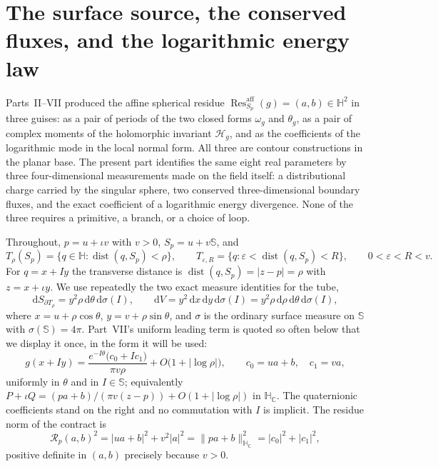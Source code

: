 \documentclass[11pt,a4paper]{article}
\numberwithin{equation}{section}
\theoremstyle{definition}
\theoremstyle{remark}
\theoremstyle{plain}
\newcommand{\HH}{\mathbb H}
\newcommand{\HC}{\mathbb H_{\mathbb C}}
\newcommand{\SSS}{\mathbb S}
\newcommand{\om}{\omega}
\newcommand{\thet}{\theta}
\newcommand{\Sp}{S_{p}}
\newcommand{\Rp}{\mathcal R_{p}}      %
\newcommand{\Hg}{\mathcal H_{g}}      %
\newcommand{\Tube}{T}
\newcommand{\abs}[1]{\lvert #1\rvert}
\newcommand{\norm}[1]{\lVert #1\rVert}
\newcommand{\dd}{\mathrm d}
\newcommand{\Resaff}{\operatorname{Res}^{\mathrm{aff}}}
\begin{document}
\section{The surface source, the conserved fluxes, and the logarithmic
energy law}
\label{e:sec:source-energy}

Parts~II--VII produced the affine spherical residue
$\Resaff_{\Sp}(g)=(a,b)\in\HH^2$ in three guises: as a pair of periods of
the two closed forms $\om_g$ and $\thet_g$, as a pair of complex moments
of the holomorphic invariant $\Hg$, and as the coefficients of the
logarithmic mode in the local normal form. All three are contour
constructions in the planar base. The present part identifies the same
eight real parameters by three four-dimensional measurements made on the
field itself: a distributional charge carried by the singular sphere, two
conserved three-dimensional boundary fluxes, and the exact coefficient of
a logarithmic energy divergence. None of the three requires a primitive,
a branch, or a choice of loop.

Throughout, $p=u+\iota v$ with $v>0$, $\Sp=u+v\SSS$, and
\[
 \Tube_\rho(\Sp)=\{q\in\HH:\operatorname{dist}(q,\Sp)<\rho\},\qquad
 \Tube_{\varepsilon,R}
   =\{q:\varepsilon<\operatorname{dist}(q,\Sp)<R\},\qquad 0<\varepsilon<R<v.
\]
For $q=x+Iy$ the transverse distance is $\operatorname{dist}(q,\Sp)=\abs{z-p}=\rho$
with $z=x+\iota y$. We use repeatedly the two exact measure identities
for the tube,
\begin{equation}
 \dd S_{\partial\Tube_\rho}=y^2\rho\,\dd\theta\,\dd\sigma(I),
 \qquad
 \dd V=y^2\,\dd x\,\dd y\,\dd\sigma(I)
      =y^{2}\rho\,\dd\rho\,\dd\theta\,\dd\sigma(I),
 \label{e:eq:tube-measures}
\end{equation}
where $x=u+\rho\cos\theta$, $y=v+\rho\sin\theta$, and $\sigma$ is the
ordinary surface measure on $\SSS$ with $\sigma(\SSS)=4\pi$. Part~VII's
uniform leading term is quoted so often below that we display it once, in
the form it will be used:
\begin{equation}
 g(x+Iy)=\frac{e^{-I\theta}\bigl(c_0+Ic_1\bigr)}{\pi v\rho}
             +O\bigl(1+\abs{\log\rho}\bigr),
 \qquad c_0=ua+b,\quad c_1=va,
 \label{e:eq:leading}
\end{equation}
uniformly in $\theta$ and in $I\in\SSS$; equivalently
$P+\iota Q=(pa+b)/(\pi v(z-p))+O(1+\abs{\log\rho})$ in $\HC$. The
quaternionic coefficients stand on the right and no commutation with $I$
is implicit. The residue norm of the contract is
\begin{equation}
 \Rp(a,b)^2=\abs{ua+b}^2+v^2\abs a^2
           =\norm{pa+b}_{\HC}^2=\abs{c_0}^2+\abs{c_1}^2,
 \label{e:eq:residue-norm}
\end{equation}
positive definite in $(a,b)$ precisely because $v>0$.
\end{document}
